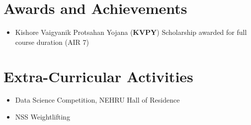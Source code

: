 \documentclass[a4paper,10pt]{article}
\begin{document}
\section{\textbf{Awards and Achievements}}
\begin{itemize}[leftmargin=*]
    \item Kishore Vaigyanik Protsahan Yojana (\textbf{KVPY}) Scholarship awarded for full course duration (AIR 7)
\end{itemize}
\vspace{-2mm}

\section{\textbf{Extra-Curricular Activities}}
\begin{itemize}[leftmargin=*]
    \item Data Science Competition, NEHRU Hall of Residence
    \item NSS Weightlifting
\end{itemize}
\end{document}
